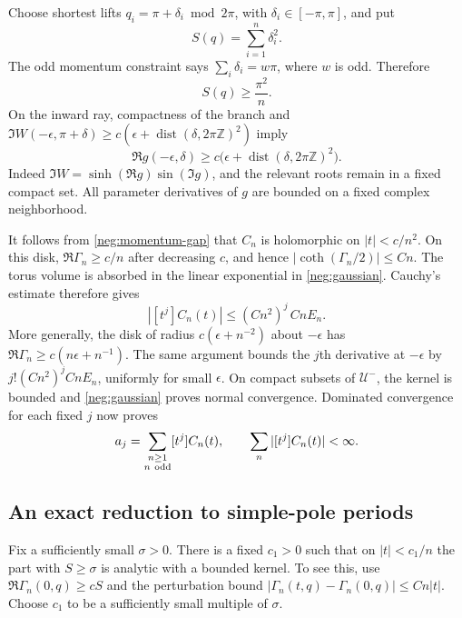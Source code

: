 \documentclass[11pt]{article}
\numberwithin{equation}{section}
\theoremstyle{definition}
\newcommand{\Z}{\mathbb Z}
\begin{document}
Choose shortest lifts \(q_i=\pi+\delta_i\bmod2\pi\), with
\(\delta_i\in[-\pi,\pi]\), and put
\[
 S(q)=\sum_{i=1}^n\delta_i^2 .
 \]
The odd momentum constraint says
\(\sum_i\delta_i=w\pi\), where \(w\) is odd.  Therefore
\begin{equation}
 S(q)\ge\frac{\pi^2}{n}.
 \label{neg:momentum-gap}
\end{equation}
On the inward ray, compactness of the branch and
\(\Im W(-\epsilon,\pi+\delta)\ge
c(\epsilon+\operatorname{dist}(\delta,2\pi\Z)^2)\) imply
\begin{equation}
 \Re g(-\epsilon,\delta)
 \ge c\bigl(\epsilon+\operatorname{dist}(\delta,2\pi\Z)^2\bigr).
 \label{neg:attenuation}
\end{equation}
Indeed \(\Im W=\sinh(\Re g)\sin(\Im g)\), and the relevant roots
remain in a fixed compact set.  All parameter derivatives of \(g\)
are bounded on a fixed complex neighborhood.

It follows from \eqref{neg:momentum-gap} that \(C_n\) is holomorphic
on \(|t|<c/n^2\).  On this disk,
\(\Re\Gamma_n\ge c/n\) after decreasing \(c\), and hence
\(|\coth(\Gamma_n/2)|\le Cn\).  The torus volume is absorbed in
the linear exponential in \eqref{neg:gaussian}.  Cauchy's estimate
therefore gives
\begin{equation}
 |[t^j]C_n(t)|\le (Cn^2)^j\,CnE_n .
 \label{neg:small-disk}
\end{equation}
More generally, the disk of radius \(c(\epsilon+n^{-2})\) about
\(-\epsilon\) has
\(\Re\Gamma_n\ge c(n\epsilon+n^{-1})\).  The same argument bounds
the \(j\)th derivative at \(-\epsilon\) by
\(j!(Cn^2)^j CnE_n\), uniformly for small \(\epsilon\).
On compact subsets of \(\mathcal U^-\), the kernel is bounded and
\eqref{neg:gaussian} proves normal convergence.  Dominated
convergence for each fixed \(j\) now proves
\begin{equation}
 a_j=\sum_{\substack{n\ge1\\n\ {\rm odd}}}[t^j]C_n(t),
 \qquad
 \sum_n |[t^j]C_n(t)|<\infty .
 \label{neg:jet-sum}
\end{equation}

\subsection{An exact reduction to simple-pole periods}
\label{neg:pole-reduction}

Fix a sufficiently small \(\sigma>0\).  There is a fixed \(c_1>0\)
such that on \(|t|<c_1/n\) the part with \(S\ge\sigma\) is analytic
with a bounded kernel.  To see this, use
\(\Re\Gamma_n(0,q)\ge cS\) and the perturbation bound
\(|\Gamma_n(t,q)-\Gamma_n(0,q)|\le Cn|t|\).
Choose \(c_1\) to be a sufficiently small multiple of \(\sigma\).
\end{document}
